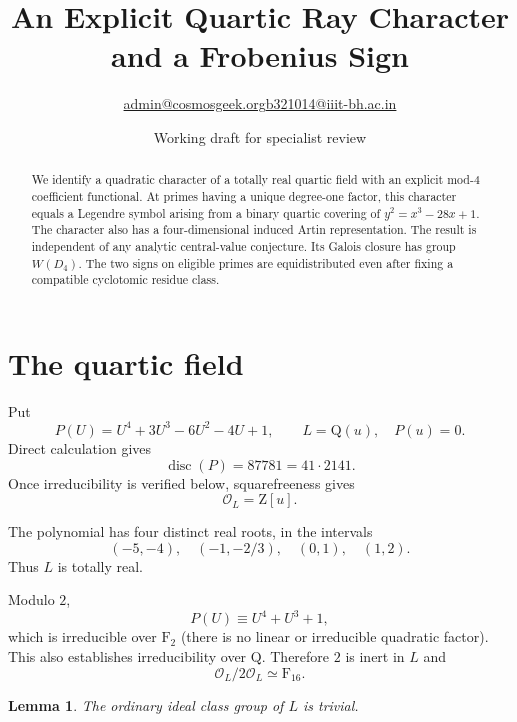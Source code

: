 \documentclass[11pt]{article}
\title{An Explicit Quartic Ray Character
and a Frobenius Sign}
\author{\small \href{mailto:admin@cosmosgeek.org}{admin@cosmosgeek.org}\qquad \href{mailto:b321014@iiit-bh.ac.in}{b321014@iiit-bh.ac.in}}
\date{Working draft for specialist review}
\newtheorem{lemma}[theorem]{Lemma}
\newcommand{\Q}{\mathrm Q}
\newcommand{\F}{\mathrm F}
\newcommand{\Z}{\mathrm Z}
\newcommand{\Ocal}{\mathcal O}
\begin{document}
\maketitle

\begin{abstract}
We identify a quadratic character of a totally real
quartic field with an explicit mod-$4$ coefficient
functional. At primes having a unique degree-one
factor, this character equals a Legendre symbol
arising from a binary quartic covering of
$y^2=x^3-28x+1$.
The character also has a four-dimensional induced
Artin representation. The result is independent
of any analytic central-value conjecture. Its Galois closure has group
$W(D_4)$. The two signs on eligible primes are equidistributed
even after fixing a compatible cyclotomic residue class.
\end{abstract}

\section{The quartic field}

Put
\[
P(U)=U^4+3U^3-6U^2-4U+1,
\qquad L=\Q(u),\quad P(u)=0.
\]
Direct calculation gives
\[
\operatorname{disc}(P)=87781=41\cdot2141.
\]
Once irreducibility is verified below, squarefreeness gives
\[
\Ocal_L=\Z[u].
\]

The polynomial has four distinct real roots,
in the intervals
\[
(-5,-4),\quad(-1,-2/3),\quad
(0,1),\quad(1,2).
\]
Thus $L$ is totally real.

Modulo $2$,
\[
P(U)\equiv U^4+U^3+1,
\]
which is irreducible over $\F_2$ (there is no linear or irreducible
quadratic factor). This also establishes irreducibility over $\Q$.
Therefore $2$ is inert in $L$ and
\[
\Ocal_L/2\Ocal_L\simeq\F_{16}.
\]

\begin{lemma}\label{lem:classnumber}
The ordinary ideal class group of $L$ is trivial.
\end{lemma}
\end{document}
